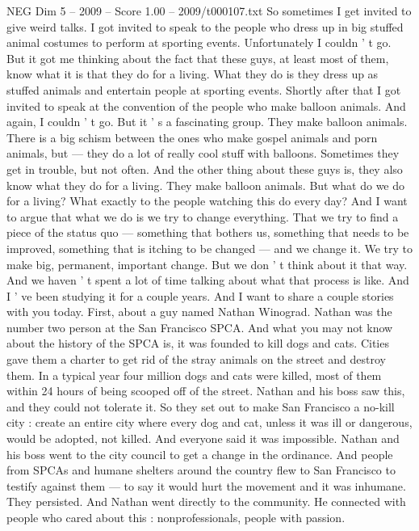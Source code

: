 \begin{textsample}{NEG Dim 5 – 2009 – Score 1.00 – 2009/t000107.txt}  \label{ex:f5_neg_048}
So sometimes I get invited to give weird talks.
I got invited to speak to the people who dress up in big stuffed animal costumes to perform at sporting events.
Unfortunately I couldn ' t go.
But it got me thinking about the fact that these guys, at least most of them, know what it is that they do for a living.
What they do is they dress up as stuffed animals and entertain people at sporting events.
Shortly after that I got invited to speak at the convention of the people who make balloon animals.
And again, I couldn ' t go.
But it ' s a fascinating group.
They make balloon animals.
There is a big schism between the ones who make gospel animals and porn animals, but — they do a lot of really cool stuff with balloons.
Sometimes they get in trouble, but not often.
And the other thing about these guys is, they also know what they do for a living.
They make balloon animals.
But what do we do for a living?
What exactly to the people watching this do every day?
And I want to argue that what we do is we try to change everything.
That we try to find a piece of the status quo — something that bothers us, something that needs to be improved, something that is itching to be changed — and we change it.
We try to make big, permanent, important change.
But we don ' t think about it that way.
And we haven ' t spent a lot of time talking about what that process is like.
And I ' ve been studying it for a couple years.
And I want to share a couple stories with you today.
First, about a guy named Nathan Winograd.
Nathan was the number two person at the San Francisco SPCA.
And what you may not know about the history of the SPCA is, it was founded to kill dogs and cats.
Cities gave them a charter to get rid of the stray animals on the street and destroy them.
In a typical year four million dogs and cats were killed, most of them within 24 hours of being scooped off of the street.
Nathan and his boss saw this, and they could not tolerate it.
So they set out to make San Francisco a no-kill city : create an entire city where every dog and cat, unless it was ill or dangerous, would be adopted, not killed.
And everyone said it was impossible.
Nathan and his boss went to the city council to get a change in the ordinance.
And people from SPCAs and humane shelters around the country flew to San Francisco to testify against them — to say it would hurt the movement and it was inhumane.
They persisted.
And Nathan went directly to the community.
He connected with people who cared about this : nonprofessionals, people with passion.

\end{textsample}
